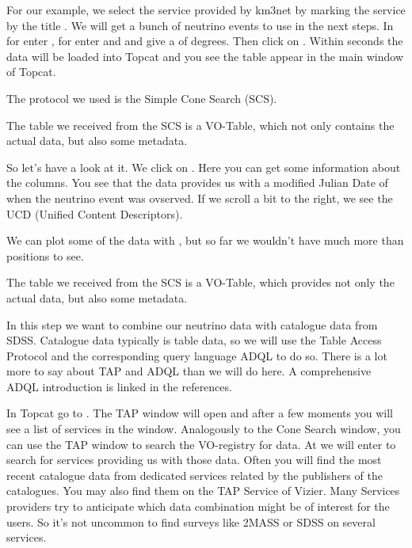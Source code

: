 \documentclass[twoside]{article}[12pt]
\begin{document}

For our example, we select the service provided by km3net by marking the
service by the title . We will get a bunch of
neutrino events to use in the next steps.  In 
for  enter , for  enter  and and give
a  of  degrees. Then click on . Within
seconds the data will be loaded into Topcat and you see the table appear
in the main window of Topcat.

The protocol we used is the Simple Cone Search (SCS).


\SCS

The table we received from the SCS is a VO-Table, which not
only contains the actual data, but also some metadata.

\VOTABLE

So let's have a look at
it. We click on \goto {}. Here you can get some
information about the columns. You see that the data provides us with a
modified Julian Date of when the neutrino event was ovserved. If we
scroll a bit to the right, we see the UCD (Unified Content Descriptors).

We can
plot some of the data with , but so far we wouldn't have
much more than positions to see. 

The table we received from the SCS is a VO-Table, which provides not
only the actual data, but also some metadata. 


In this step we want to combine our neutrino data with catalogue data
from SDSS. Catalogue data typically is table data, so we will use the
Table Access Protocol and the corresponding query language ADQL to do
so. There is a lot more to say about TAP and ADQL than we will do here.
A comprehensive ADQL introduction is linked in the references. 

In Topcat go to  \goto{}. The TAP window will open and
after a few moments you will see a list of services in the window.
Analogously to the Cone Search window, you can use the TAP window to
search the VO-registry for data. At  we will enter
 to search for services providing us with those data. Often
you will find the most recent catalogue data from dedicated services
related by the publishers of the catalogues. You may also find them on
the TAP Service of Vizier. Many Services providers try to anticipate
which data combination might be of interest for the users. So it's not
uncommon to find surveys like 2MASS or SDSS on several services. 
\TAPSTD
\end{document}
